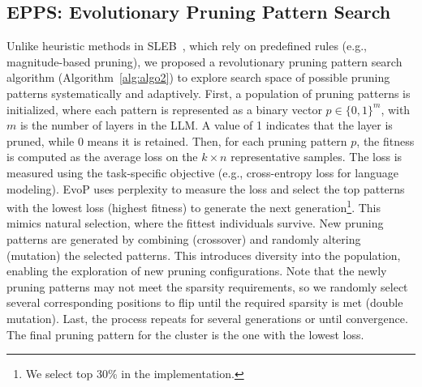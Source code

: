 \subsection{EPPS: Evolutionary Pruning Pattern Search}
Unlike heuristic methods in SLEB~\cite{sleb}, which rely on predefined rules (e.g., magnitude-based pruning), we proposed a revolutionary pruning pattern search algorithm (Algorithm~\ref{alg:algo2}) to explore search space of possible pruning patterns systematically and adaptively. 
First, a population of pruning patterns is initialized, where each pattern is represented as a binary vector $p \in \{0,1\}^{m}$, with 
$m$ is the number of layers in the LLM.
A value of 1 indicates that the layer is pruned, while 0 means it is retained. 
Then, for each pruning pattern $p$, the fitness is computed as the average loss on the $k\times n$ representative samples.
The loss is measured using the task-specific objective (e.g., cross-entropy loss for language modeling). 
EvoP uses perplexity to measure the loss and select the top patterns with the lowest loss (highest fitness) to generate the next generation\footnote{We select top 30\% in the implementation.}.
This mimics natural selection, where the fittest individuals survive. 
New pruning patterns are generated by combining (crossover) and randomly altering (mutation) the selected patterns. 
This introduces diversity into the population, enabling the exploration of new pruning configurations. Note that the newly pruning patterns may not meet the sparsity requirements, so we randomly select several corresponding positions to flip until the required sparsity is met (double mutation).
Last, the process repeats for several generations or until convergence. 
The final pruning pattern for the cluster is the one with the lowest loss.


 
